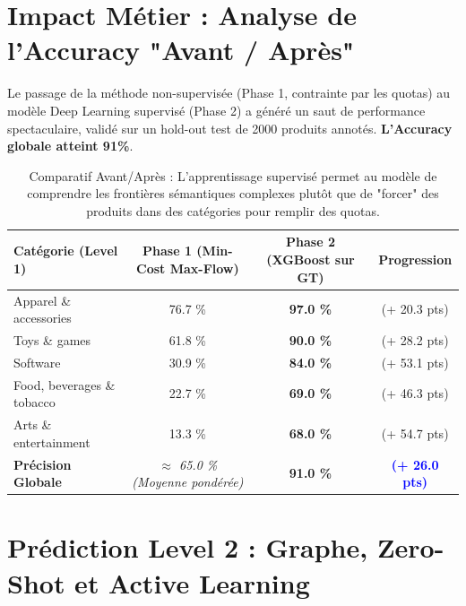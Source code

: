 \documentclass[11pt,a4paper]{article}
\begin{document}
\section{Impact Métier : Analyse de l'Accuracy "Avant / Après"}

Le passage de la méthode non-supervisée (Phase 1, contrainte par les quotas) au modèle Deep Learning supervisé (Phase 2) a généré un saut de performance spectaculaire, validé sur un hold-out test de 2000 produits annotés. \textbf{L'Accuracy globale atteint 91\%}.

\begin{table}[H]
\centering
\small
\begin{tabular}{lccc}
\toprule
\textbf{Catégorie (Level 1)} & \textbf{Phase 1 (Min-Cost Max-Flow)} & \textbf{Phase 2 (XGBoost sur GT)} & \textbf{Progression} \\
\midrule
Apparel \& accessories & 76.7 \% & \textbf{97.0 \%} & \textcolor{green!60!black}{(+ 20.3 pts)} \\
Toys \& games & 61.8 \% & \textbf{90.0 \%} & \textcolor{green!60!black}{(+ 28.2 pts)} \\
Software & 30.9 \% & \textbf{84.0 \%} & \textcolor{green!60!black}{(+ 53.1 pts)} \\
Food, beverages \& tobacco & 22.7 \% & \textbf{69.0 \%} & \textcolor{green!60!black}{(+ 46.3 pts)} \\
Arts \& entertainment & 13.3 \% & \textbf{68.0 \%} & \textcolor{green!60!black}{(+ 54.7 pts)} \\
\midrule
\textbf{Précision Globale} & \textit{$\approx$ 65.0 \% (Moyenne pondérée)} & \textbf{91.0 \%} & \textbf{\textcolor{blue}{(+ 26.0 pts)}} \\
\bottomrule
\end{tabular}
\caption{Comparatif Avant/Après : L'apprentissage supervisé permet au modèle de comprendre les frontières sémantiques complexes plutôt que de "forcer" des produits dans des catégories pour remplir des quotas.}
\label{tab:avant_apres}
\end{table}

\section{Prédiction Level 2 : Graphe, Zero-Shot et Active Learning}
\end{document}

